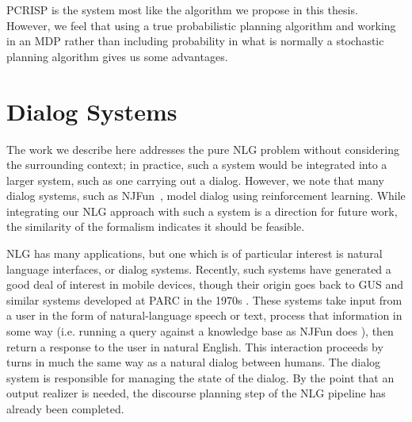 PCRISP is the system most like the algorithm we propose in this thesis.
However, we feel that using a true probabilistic planning algorithm
and working in an MDP rather than including probability in what
is normally a stochastic planning algorithm gives us some advantages.

\section{Dialog Systems}

The work we describe here addresses the pure NLG problem without
considering the surrounding context; in practice, such a system would
be integrated into a larger system, such as one carrying out a
dialog. However, we note that many dialog systems, such as
NJFun~\cite{litman_njfun_2000}, model dialog using reinforcement
learning. While integrating our NLG approach with such a system is a
direction for future work, the similarity of the formalism indicates
it should be feasible.

NLG has many applications, but one which is of particular interest is
natural language interfaces, or dialog systems.  Recently, such
systems have generated a good deal of interest in mobile devices,
though their origin goes back to GUS and similar systems developed at PARC
in the 1970s \cite{bobrow_gus_1977}.  These systems take input from a user
in the form of natural-language speech or text, process that information in 
some way (i.e. running a query against a knowledge base as NJFun does
\cite{litman_njfun_2000}), then return a response to the user in
natural English.  This interaction proceeds by turns in much the same way
as a natural dialog between humans.  The dialog system is responsible
for managing the state of the dialog.  By the point that an output realizer is 
needed, the discourse planning step of the NLG pipeline has already been
completed.